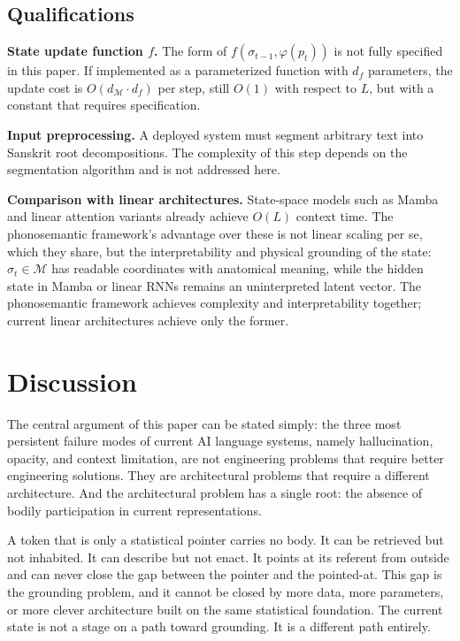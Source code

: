 \documentclass[12pt]{article}
\begin{document}
\subsection{Qualifications}

\textbf{State update function $f$.}
The form of $f(\sigma_{t-1}, \varphi(p_t))$ is not fully specified in this paper. If implemented as a parameterized function with $d_f$ parameters, the update cost is $O(d_\mathcal{M} \cdot d_f)$ per step, still $O(1)$ with respect to $L$, but with a constant that requires specification.

\textbf{Input preprocessing.}
A deployed system must segment arbitrary text into Sanskrit root decompositions. The complexity of this step depends on the segmentation algorithm and is not addressed here.

\textbf{Comparison with linear architectures.}
State-space models such as Mamba \cite{gu2022mamba} and linear attention variants \cite{katharopoulos2020} already achieve $O(L)$ context time. The phonosemantic framework's advantage over these is not linear scaling per se, which they share, but the interpretability and physical grounding of the state: $\sigma_t \in \mathcal{M}$ has readable coordinates with anatomical meaning, while the hidden state in Mamba or linear RNNs remains an uninterpreted latent vector. The phonosemantic framework achieves complexity and interpretability together; current linear architectures achieve only the former.


\section{Discussion}

The central argument of this paper can be stated simply: the three most persistent failure modes of current AI language systems, namely hallucination, opacity, and context limitation, are not engineering problems that require better engineering solutions. They are architectural problems that require a different architecture. And the architectural problem has a single root: the absence of bodily participation in current representations.

A token that is only a statistical pointer carries no body. It can be retrieved but not inhabited. It can describe but not enact. It points at its referent from outside and can never close the gap between the pointer and the pointed-at. This gap is the grounding problem, and it cannot be closed by more data, more parameters, or more clever architecture built on the same statistical foundation. The current state is not a stage on a path toward grounding. It is a different path entirely.
\end{document}
